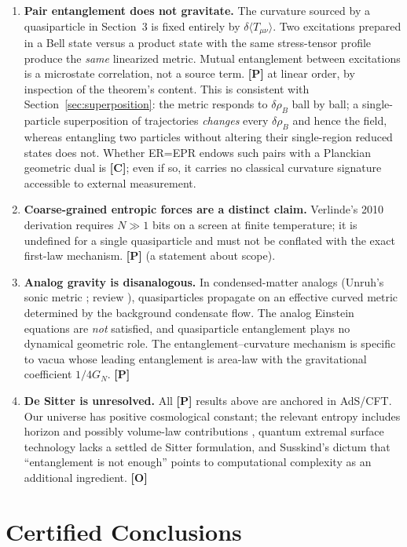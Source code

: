 \documentclass[11pt]{article}
\theoremstyle{definition}
\newcommand{\pP}{\textbf{[P]}}
\newcommand{\pC}{\textbf{[C]}}
\newcommand{\pO}{\textbf{[O]}}
\begin{document}
\begin{enumerate}[itemsep=2pt]
\item \textbf{Pair entanglement does not gravitate.} The curvature sourced by
a quasiparticle in Section~3 is fixed entirely by
$\delta\langle T_{\mu\nu}\rangle$. Two excitations prepared in a Bell state
versus a product state with the same stress-tensor profile produce the
\emph{same} linearized metric. Mutual entanglement between excitations is a
microstate correlation, not a source term. \pP{} at linear order, by
inspection of the theorem's content. This is consistent with
Section~\ref{sec:superposition}: the metric responds to $\delta\rho_B$ ball
by ball; a single-particle superposition of trajectories \emph{changes} every
$\delta\rho_B$ and hence the field, whereas entangling two particles without
altering their single-region reduced states does not. Whether ER=EPR endows such pairs with a
Planckian geometric dual is \pC{}; even if so, it carries no classical
curvature signature accessible to external measurement.
\item \textbf{Coarse-grained entropic forces are a distinct claim.}
Verlinde's 2010 derivation \cite{Verlinde2011} requires $N\gg1$ bits on a
screen at finite temperature; it is undefined for a single quasiparticle and
must not be conflated with the exact first-law mechanism. \pP{} (a statement
about scope).
\item \textbf{Analog gravity is disanalogous.} In condensed-matter analogs
(Unruh's sonic metric \cite{Unruh1981}; review \cite{BLV2005}), quasiparticles
propagate on an effective curved metric determined by the background
condensate flow. The analog Einstein equations are \emph{not} satisfied, and
quasiparticle entanglement plays no dynamical geometric role. The
entanglement--curvature mechanism is specific to vacua whose leading
entanglement is area-law with the gravitational coefficient $1/4G_N$. \pP{}
\item \textbf{De Sitter is unresolved.} All \pP{} results above are anchored
in AdS/CFT. Our universe has positive cosmological constant; the relevant
entropy includes horizon and possibly volume-law contributions
\cite{Verlinde2017}, quantum extremal surface technology
\cite{EngelhardtWall2015} lacks a settled de Sitter formulation, and
Susskind's dictum that ``entanglement is not enough'' points to computational
complexity as an additional ingredient. \pO{}
\end{enumerate}

\section{Certified Conclusions}
\end{document}
